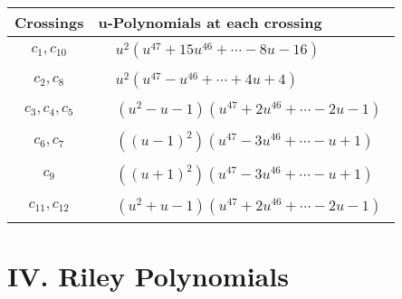 \documentclass[1p]{elsarticle_modified}
\theoremstyle{definition}
\begin{document}
\begin{tabular}{m{50pt}|m{274pt}}
Crossings & \hspace{64pt}u-Polynomials at each crossing \\
\hline $$\begin{aligned}c_{1},c_{10}\end{aligned}$$&$\begin{aligned}
&u^2(u^{47}+15 u^{46}+\cdots-8 u-16)
\end{aligned}$\\
\hline $$\begin{aligned}c_{2},c_{8}\end{aligned}$$&$\begin{aligned}
&u^2(u^{47}- u^{46}+\cdots+4 u+4)
\end{aligned}$\\
\hline $$\begin{aligned}c_{3},c_{4},c_{5}\end{aligned}$$&$\begin{aligned}
&(u^2- u-1)(u^{47}+2 u^{46}+\cdots-2 u-1)
\end{aligned}$\\
\hline $$\begin{aligned}c_{6},c_{7}\end{aligned}$$&$\begin{aligned}
&((u-1)^2)(u^{47}-3 u^{46}+\cdots- u+1)
\end{aligned}$\\
\hline $$\begin{aligned}c_{9}\end{aligned}$$&$\begin{aligned}
&((u+1)^2)(u^{47}-3 u^{46}+\cdots- u+1)
\end{aligned}$\\
\hline $$\begin{aligned}c_{11},c_{12}\end{aligned}$$&$\begin{aligned}
&(u^2+u-1)(u^{47}+2 u^{46}+\cdots-2 u-1)
\end{aligned}$\\
\hline
\end{tabular}\newpage\renewcommand{\arraystretch}{1}
\centering \section*{ IV. Riley Polynomials}
\end{document}
